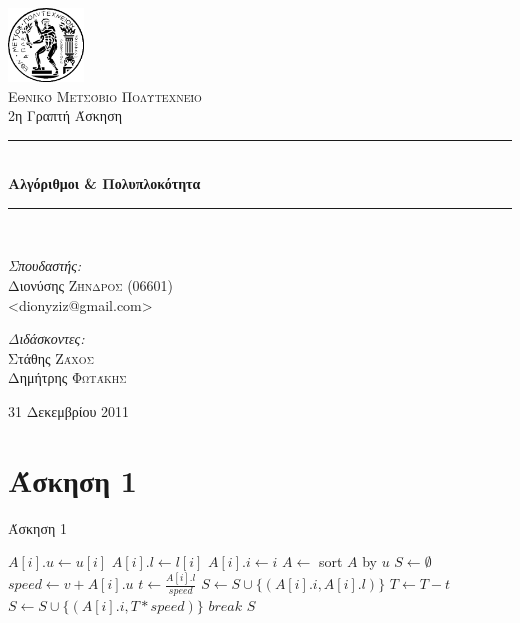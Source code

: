 \documentclass[11pt,a4paper]{book}
\newcommand{\HRule}{\rule{\linewidth}{0.5mm}}
\begin{document}
\begin{titlepage}
\begin{center}

\includegraphics[width=0.15\textwidth]{Pyrforos3.png}\\[1cm]
\textsc{\LARGE Εθνικό Μετσόβιο Πολυτεχνείο}\\[1.5cm]

\Large{ 2η Γραπτή Άσκηση }\\[0.5cm]

\begin{doublespace}
\HRule \\[0.4cm]
{\huge \bfseries
Αλγόριθμοι \& Πολυπλοκότητα
}\\[0.4cm]
\end{doublespace}

\HRule \\[1.5cm]

\begin{minipage}{0.4\textwidth}
\begin{flushleft} \large
\emph{Σπουδαστής:} \\
Διονύσης \textsc{Ζήνδρος} (06601)\\
\textlatin{\textless dionyziz@gmail.com\textgreater}
\end{flushleft}
\end{minipage}
\begin{minipage}{0.4\textwidth}
\begin{flushright} \large
\emph{Διδάσκοντες:} \\
Στάθης \textsc{Ζάχος}\\
Δημήτρης \textsc{Φωτάκης}
\end{flushright}
\end{minipage}

\vfill

{\large 31 Δεκεμβρίου 2011}
\end{center}
\end{titlepage}

\section*{Άσκηση 1}
\begin{algorithm}[H]
\caption{\textgreek{Άσκηση 1}}
\begin{algorithmic}[1]
		\State $A[ i ].u \gets u[ i ]$
		\State $A[ i ].l \gets l[ i ]$
		\State $A[ i ].i \gets i$
	\EndFor
	\State $A \gets $ sort $A$ by $u$
	\State $S \gets \emptyset$
		\State $speed \gets v + A[ i ].u$
		\State $t \gets \frac{A[ i ].l}{speed}$
			\State $S \gets S \cup \{ ( A[ i ].i, A[ i ].l ) \}$
			\State $T \gets T - t$
		\Else
			\State $S \gets S \cup \{ ( A[ i ].i, T * speed ) \}$
			\State $break$
		\EndIf
	\EndFor
	\State \Return $S$
\EndProcedure
\end{algorithmic}
\end{algorithm}
\end{document}
